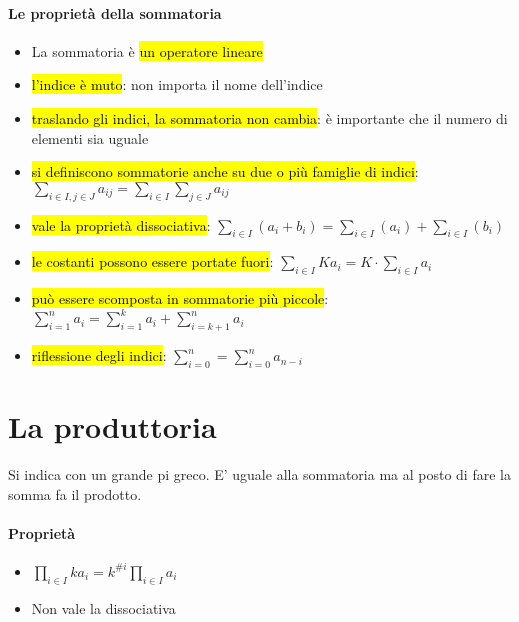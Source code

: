 \paragraph{Le proprietà della sommatoria} 
\begin{itemize}
    \item La sommatoria è \hl{un operatore lineare}
    \item \hl{l'indice è muto}: non importa il nome dell'indice 
    \item \hl{traslando gli indici, la sommatoria non cambia}: è importante 
        che il numero di elementi sia uguale
    \item \hl{si definiscono sommatorie anche su due o più famiglie di indici}: 
        $\sum_{i \in I, j \in J} a_{ij} = \sum_{i \in I}\sum_{j \in J} a_{ij}$
    \item \hl{vale la proprietà dissociativa}:
        $\sum_{i \in I} (a_i + b_i) = \sum_{i \in I} (a_i) + \sum_{i \in I} (b_i)$
    \item \hl{le costanti possono essere portate fuori}:
        $\sum_{i \in I} Ka_i = K\cdot\sum_{i \in I} a_i$
    \item \hl{può essere scomposta in sommatorie più piccole}:
        $\sum_{i=1}^n a_i = \sum_{i=1}^k a_i + \sum_{i=k+1}^n a_i$
    \item \hl{riflessione degli indici}:
        $\sum_{i=0}^n = \sum_{i=0}^n a_{n-i}$
\end{itemize}

\section{La produttoria}
Si indica con un grande pi greco. E' uguale alla sommatoria ma al posto di
fare la somma fa il prodotto.

\paragraph{Proprietà}
\begin{itemize}
    \item $\prod_{i \in I} ka_i = k^{\#i}\prod_{i \in I} a_i$
    \item Non vale la dissociativa
\end{itemize} 
